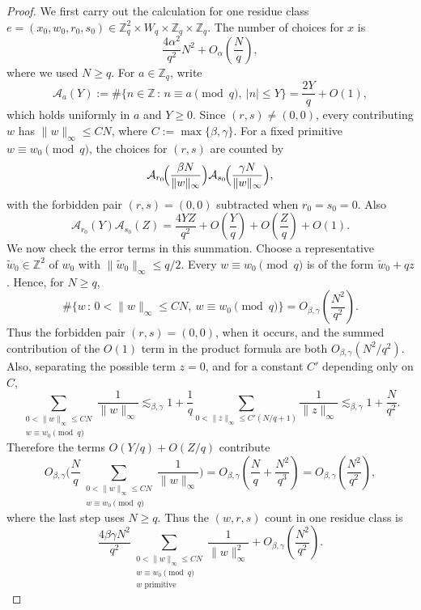 \documentclass[10pt,a4paper]{amsart}
\numberwithin{equation}{section}
\newcommand{\norm}[1]{\lVert #1\rVert_\infty}
\renewcommand{\le}{\leqslant}
\renewcommand{\ge}{\geqslant}
\begin{document}
\begin{proof}
We first carry out the calculation for one residue class
$e=(x_0,w_0,r_0,s_0)\in\mathbb{Z}_q^2\times W_q\times
\mathbb{Z}_q\times\mathbb{Z}_q$. The number of choices for $x$ is
\[ \frac{4\alpha^2}{q^2}N^2+O_{\alpha}\left(\frac{N}{q}\right), \]
where we used $N\ge q$. For $a\in\mathbb{Z}_q$, write
\[ \mathcal{A}_a(Y):=\#\{n\in\mathbb{Z} \,:\, n\equiv a\!\!\!\pmod q,
\ |n|\le Y\}=\frac{2Y}{q}+O(1), \]
which holds uniformly in $a$ and $Y\ge0$. Since $(r,s)\ne(0,0)$, every contributing $w$ has $\norm{w}\le CN$, where $C:=\max\{\beta,\gamma\}$. For a fixed primitive $w\equiv w_0\pmod q$, the choices for $(r,s)$ are counted by
\[ \mathcal{A}_{r_0}\!\Bigl(\frac{\beta N}{\norm{w}}\Bigr)
\mathcal{A}_{s_0}\!\Bigl(\frac{\gamma N}{\norm{w}}\Bigr), \]
with the forbidden pair $(r,s)=(0,0)$ subtracted when $r_0=s_0=0$. Also
\[ \mathcal{A}_{r_0}(Y)\mathcal{A}_{s_0}(Z)
=\frac{4YZ}{q^2}+O\left(\frac{Y}{q}\right)+O\left(\frac{Z}{q}\right)+O(1). \]
We now check the error terms in this summation. Choose a representative $\widetilde w_0\in\mathbb{Z}^2$ of $w_0$ with $\norm{\widetilde w_0}\le q/2$. Every $w\equiv w_0\pmod q$ is of the form $\widetilde w_0+qz$. Hence, for $N\ge q$,
\[ \#\{w \,:\, 0<\norm{w}\le CN,\ w\equiv w_0\!\!\!\pmod q\}=O_{\beta,\gamma}\left(\frac{N^2}{q^2}\right). \]
Thus the forbidden pair $(r,s)=(0,0)$, when it occurs, and the summed contribution of the $O(1)$ term in the product formula are both $O_{\beta,\gamma}(N^2/q^2)$. Also, separating the possible term $z=0$, and for a constant $C'$ depending only on $C$,
\[ \sum_{\substack{0<\norm{w}\le CN\\ w\equiv w_0\!\!\!\pmod q}}\frac1{\norm{w}}
\lesssim_{\beta,\gamma} 1 + \frac1q\sum_{0<\norm{z}\le C'(N/q+1)}\frac1{\norm{z}}
\lesssim_{\beta,\gamma} 1 + \frac{N}{q^2}. \]
Therefore the terms $O(Y/q)+O(Z/q)$ contribute
\[ O_{\beta,\gamma}\biggl(\frac Nq \sum_{\substack{0<\norm{w}\le CN\\ w\equiv w_0\!\!\!\pmod q}}\frac1{\norm{w}}\biggr)
=O_{\beta,\gamma}\left(\frac Nq+\frac{N^2}{q^3}\right)
=O_{\beta,\gamma}\left(\frac{N^2}{q^2}\right), \]
where the last step uses $N\ge q$.
Thus the $(w,r,s)$ count in one residue class is
\begin{equation}\label{eq:wrsmain}
\frac{4\beta\gamma N^2}{q^2}
\sum_{\substack{0<\norm{w}\le CN\\ w\equiv w_0 \!\!\!\pmod q\\ w\text{ primitive}}} \frac1{\norm{w}^2} + O_{\beta,\gamma}\left(\frac{N^2}{q^2}\right).
\end{equation}


\end{proof}
\end{document}
